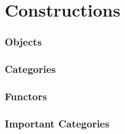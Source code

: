 \part{Constructions}

\section{Objects}











\section{Categories}







\section{Functors}







\section{Important Categories}




